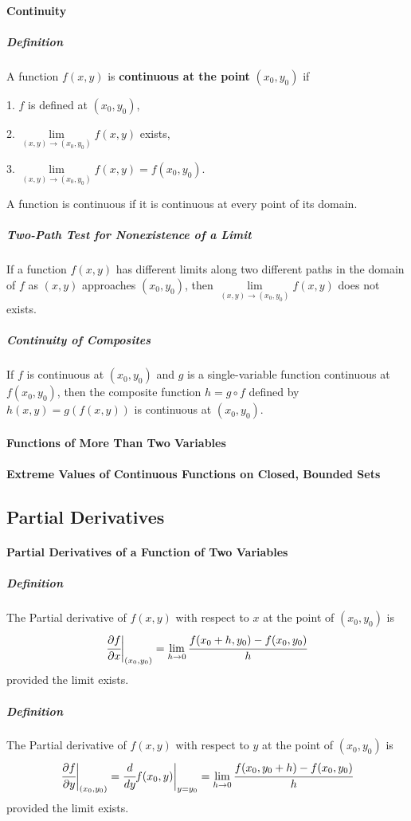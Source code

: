 \documentclass{article}
\begin{document}
            \paragraph{Continuity}
                \subparagraph{Definition} A function $f(x,y)$ is \textbf{continuous at the point} $(x_0,y_0)$ if 
                \par 1. $f$ is defined at $(x_0,y_0)$,
                \par 2. $\lim\limits_{(x,y)\to(x_0,y_0)}f(x,y)$ exists,
                \par 3. $\lim\limits_{(x,y)\to(x_0,y_0)}f(x,y)=f(x_0,y_0)$.
                \par A function is continuous if it is continuous at every point of its domain.
                \subparagraph{Two-Path Test for Nonexistence of a Limit}
                If a function $f(x,y)$ has different limits along two different paths in the domain of $f$ as $(x,y)$ approaches $(x_0,y_0)$, then $\lim\limits_{(x,y)\to(x_0,y_0)}f(x,y)$ does not exists.
                \subparagraph{Continuity of Composites}
                    If $f$ is continuous at $(x_0,y_0)$ and $g$ is a single-variable function continuous at $f(x_0,y_0)$, then the composite function $h=g\circ f$ defined by $h(x,y)=g(f(x,y))$ is continuous at $(x_0,y_0)$.
            \paragraph{Functions of More Than Two Variables}
            \paragraph{Extreme Values of Continuous Functions on Closed, Bounded Sets}
        \subsection{Partial Derivatives}
            \paragraph{Partial Derivatives of a Function of Two Variables}
                \subparagraph{Definition} The Partial derivative of $f(x,y)$ with respect to $x$ at the point of $(x_0,y_0)$ is
                \[\cfrac{\partial f}{\partial x}\bigg|_{(x_0,y_0)}=\lim\limits_{h\to 0}\cfrac{f(x_0+h,y_0)-f(x_0,y_0)}{h}\]
                provided the limit exists.
                \subparagraph{Definition} The Partial derivative of $f(x,y)$ with respect to $y$ at the point of $(x_0,y_0)$ is
                \[\cfrac{\partial f}{\partial y}\bigg|_{(x_0,y_0)}=\cfrac{d}{dy}f(x_0,y)\bigg|_{y=y_0}=\lim\limits_{h\to 0}\cfrac{f(x_0,y_0+h)-f(x_0,y_0)}{h}\]
                provided the limit exists.
\end{document}
